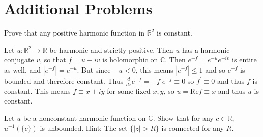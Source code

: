 \documentclass{article}
\newcounter{Problem}
\newenvironment{Problem}{\begin{Exercise}[name={Problem},
                                          counter={Problem}]}
                        {\end{Exercise}}
\begin{document}
\section{Additional Problems}
\begin{Problem}
Prove that any positive harmonic function in $\mathbb{R}^2$ is constant.
\end{Problem}

\begin{Answer}
Let $u : \mathbb{R}^2 \to \mathbb{R}$ be harmonic and strictly
positive. Then $u$ has a harmonic conjugate $v$, so that
$f = u + i v$ is holomorphic on $\mathbb{C}$. Then
$e^{-f} = e^{-u} e^{-iv}$ is entire as well, and $|e^{-f}| = e^{-u}$.
But since $-u < 0$, this means $|e^{-f}| \leq 1$ and so $e^{-f}$
is bounded and therefore constant. Thus
$\frac{d}{dz} e^{-f} = -f^\prime e^{-f} \equiv 0$  so $f^\prime \equiv
0$ and thus $f$ is constant. This means $f \equiv x + i y$ for some
fixed $x, y$, so $u = \mathrm{Re} f \equiv x$ and thus $u$ is constant.
\end{Answer}

\begin{Problem}
Let $u$ be a nonconstant harmonic function on $\mathbb{C}$. Show that
for any $c \in \mathbb{R}$, $u^{-1}(\{ c \})$ is unbounded.
Hint: The set $\{ |z| > R \}$ is connected for any $R$.
\end{Problem}
\end{document}
